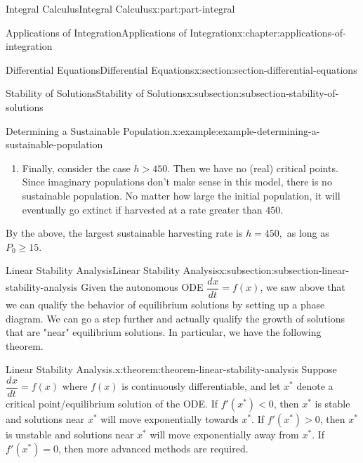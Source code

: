 \documentclass[twoside,10pt,]{book}
\newcommand{\terminology}[1]{\textbf{#1}}
\numberwithin{equation}{part}
\newcommand{\dv}[3][]{\dfrac{d^{#1} #2}{d #3^{#1}}}
\newcommand{\lt}{<}
\newcommand{\gt}{>}
\begin{document}
\begin{partptx}{Integral Calculus}{}{Integral Calculus}{}{}{x:part:part-integral}
\begin{chapterptx}{Applications of Integration}{}{Applications of Integration}{}{}{x:chapter:applications-of-integration}
\begin{sectionptx}{Differential Equations}{}{Differential Equations}{}{}{x:section:section-differential-equations}
\begin{subsectionptx}{Stability of Solutions}{}{Stability of Solutions}{}{}{x:subsection:subsection-stability-of-solutions}
\begin{example}{Determining a Sustainable Population.}{x:example:example-determining-a-sustainable-population}
\begin{enumerate}
\begin{figureptx}{Phase diagram for \(h\) = 450.}{x:figure:figure-phase-diagram-equal-450}{}
\begin{image}{0.25}{0.5}{0.25}
{
}%
\end{image}%
\tcblower
\end{figureptx}%
We interpret the phase diagram as follows: if \(P\) is less than 15,000%
 then the population will collapse to extinction. Otherwise, the population will stabilize at \(15,000\). This type of critical point is often called \terminology{semi-stable.}%
\item{}Finally, consider the case \(h \gt 450\). Then we have no (real) critical points. Since imaginary populations don't make sense in this model, there is no sustainable population. No matter how large the initial population, it will eventually go extinct if harvested at a rate greater than \(450\).%
\end{enumerate}
By the above, the largest sustainable harvesting rate is \(h = 450,\) as long as \(P_{0}\geq 15\).%
\end{example}
\end{subsectionptx}
%
%
\typeout{************************************************}
\typeout{************************************************}
%
\begin{subsectionptx}{Linear Stability Analysis}{}{Linear Stability Analysis}{}{}{x:subsection:subsection-linear-stability-analysis}
Given the autonomous ODE \(\dv{x}{t} = f(x)\), we saw above that we can qualify the behavior of equilibrium solutions by setting up a phase diagram. We can go a step further and actually qualify the growth of solutions that are "near" equilibrium solutions. In particular, we have the following theorem.%
\begin{theorem}{Linear Stability Analysis.}{}{x:theorem:theorem-linear-stability-analysis}%
Suppose \(\dv{x}{t} = f(x)\) where \(f(x)\) is continuously differentiable, and let \(x^{*}\) denote a critical point\slash{}equilibrium solution of the ODE. If \(f'(x^{*}) \lt 0\), then \(x^{*}\) is stable and solutions near \(x^{*}\) will move exponentially towards \(x^{*}\). If \(f'(x^{*}) \gt 0\), then \(x^{*}\) is unstable and solutions near \(x^{*}\) will move exponentially away from \(x^{*}\). If \(f'(x^{*}) = 0\), then more advanced methods are required.%

\end{theorem}
\end{subsectionptx}
\end{sectionptx}
\end{chapterptx}
\end{partptx}
\end{document}
